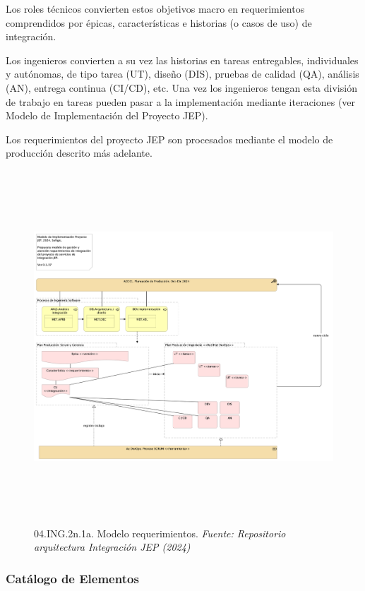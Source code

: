 \documentclass[
  paper=a4,
  ,captions=tableheading
]{scrartcl}
\begin{document}
Los roles técnicos convierten estos objetivos macro en requerimientos
comprendidos por épicas, características e historias (o casos de uso) de
integración.

Los ingenieros convierten a su vez las historias en tareas entregables,
individuales y autónomas, de tipo tarea (UT), diseño (DIS), pruebas de
calidad (QA), análisis (AN), entrega continua (CI/CD), etc. Una vez los
ingenieros tengan esta división de trabajo en tareas pueden pasar a la
implementación mediante iteraciones (ver Modelo de Implementación del
Proyecto JEP).

Los requerimientos del proyecto JEP son procesados mediante el modelo de
producción descrito más adelante.

\begin{figure}
\centering
\includegraphics[width=\textwidth,height=5.20833in]{images/04.ING.2n.1a.Modelorequerimientos.png}
\caption{04.ING.2n.1a. Modelo requerimientos. \emph{Fuente: Repositorio
arquitectura Integración JEP
(2024)}}\label{fig:id-7c3abdaa8d9b46eebfd8f8e3e8d912ce}
\end{figure}

\subsubsection{Catálogo de
Elementos}\label{sec:catuxe1logo-de-elementos-1}
\end{document}
